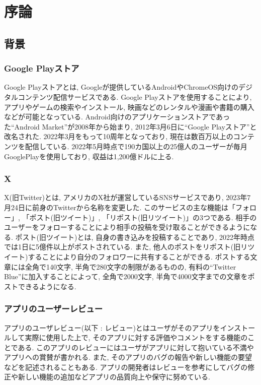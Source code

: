 \chapter{序論}
\label{chap:jyoron}

\section{背景}

\subsection{Google Playストア}
Google Playストア\cite{google-play-store}とは, Googleが提供しているAndroidやChromeOS向けのデジタルコンテンツ配信サービスである. Google Playストアを使用することにより, アプリやゲームの検索やインストール, 映画などのレンタルや漫画や書籍の購入などが可能となっている. 
Android向けのアプリケーションストアであった``Android Market''が2008年から始まり, 2012年3月6日に``Google Playストア''と改名された. 2022年3月をもって10周年となっており, 現在は数百万以上のコンテンツを配信している\cite{about-google-play}. 
2022年5月時点で190カ国以上の25億人のユーザーが毎月GooglePlayを使用しており, 収益は1,200億ドルに上る\cite{purnima-kochikar}. 

\subsection{X}
X(旧Twitter)\cite{twitter}とは, アメリカのX社が運営しているSNSサービスであり, 2023年7月24日に前身のTwitterから名称を変更した. 
このサービスの主な機能は「フォロー」, 「ポスト(旧ツイート)」, 「リポスト(旧リツイート)」の3つである. 相手のユーザーをフォローすることにより相手の投稿を受け取ることができるようになる. ポスト(旧ツイート)とは, 自身の書き込みを投稿することであり, 2022年時点では1日に5億件以上がポストされている\cite{aboutx}. また, 他人のポストをリポスト(旧リツイート)することにより自分のフォロワーに共有することができる. 
ポストする文章には全角で140文字, 半角で280文字の制限があるものの, 有料の``Twitter Blue''に加入することによって, 全角で2000文字, 半角で4000文字までの文章をポストできるようになる. 

\subsection{アプリのユーザーレビュー}
アプリのユーザレビュー(以下 : レビュー)とはユーザがそのアプリをインストールして実際に使用した上で, そのアプリに対する評価やコメントをする機能のことである. 
このアプリのレビューにはユーザがアプリに対して抱いている不満やアプリへの賞賛が書かれる. また, そのアプリのバグの報告や新しい機能の要望などを記述されることもある. 
アプリの開発者はレビューを参考にしてバグの修正や新しい機能の追加などアプリの品質向上や保守に努めている. 

